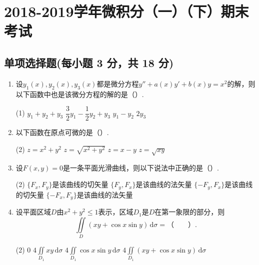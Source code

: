 \documentclass[../Main.tex]{subfiles}
\begin{document}
\chapter{2018-2019学年微积分（一）（下）期末考试}

\section{单项选择题(每小题 3 分，共 18 分)}
\begin{enumerate}
    \item 设$y_{1}(x),y_{2}(x),y_{3}(x)$都是微分方程$y''+a(x)y'+b(x)y=x^{2}$的解，则以下函数中也是该微分方程的解的是（\qquad）.

          \begin{tasks}[label=\textbf{\Alph*.}, label-width=1.5em, column-sep=1em](1)
              \task $y_{1}+y_{2}+y_{3}$
              \task $\dfrac32 y_{1}-\dfrac12 y_{2}+y_{3}$
              \task $y_{1}-y_{2}$
              \task $2y_{3}$
          \end{tasks}

    \item 以下函数在原点可微的是（\qquad）.

          \begin{tasks}[label=\textbf{\Alph*.}, label-width=1.5em, column-sep=1em](2)
              \task $z=x^{2}+y^{2}$
              \task $z=\sqrt{x^{2}+y^{2}}$
              \task $z=x-y$
              \task $z=\sqrt{xy}$
          \end{tasks}

    \item 设$F(x,y)=0$是一条平面光滑曲线，则以下说法中正确的是（\qquad）.

          \begin{tasks}[label=\textbf{\Alph*.}, label-width=1.5em, column-sep=1em](2)
              \task $\{F_{x},F_{y}\}$是该曲线的切矢量
              \task $\{F_{y},F_{x}\}$是该曲线的法矢量
              \task $\{-F_{y},F_{x}\}$是该曲线的切矢量
              \task $\{-F_{x},F_{y}\}$是该曲线的法矢量
          \end{tasks}

    \item 设平面区域$D$由$x^{2}+y^{2}\leq1$表示，区域$D_{1}$是$D$在第一象限的部分，则
          \[
              \iint\limits_{D}(xy+\cos x\sin y)\,\mathrm{d}\sigma=（\qquad）.
          \]

          \begin{tasks}[label=\textbf{\Alph*.}, label-width=1.5em, column-sep=1em](2)
              \task $0$
              \task $4\iint\limits_{D_{1}}xy\,\mathrm{d}\sigma$
              \task $4\iint\limits_{D_{1}}\cos x\sin y\,\mathrm{d}\sigma$
              \task $4\iint\limits_{D_{1}}(xy+\cos x\sin y)\,\mathrm{d}\sigma$
          \end{tasks}


\end{enumerate}
\end{document}
